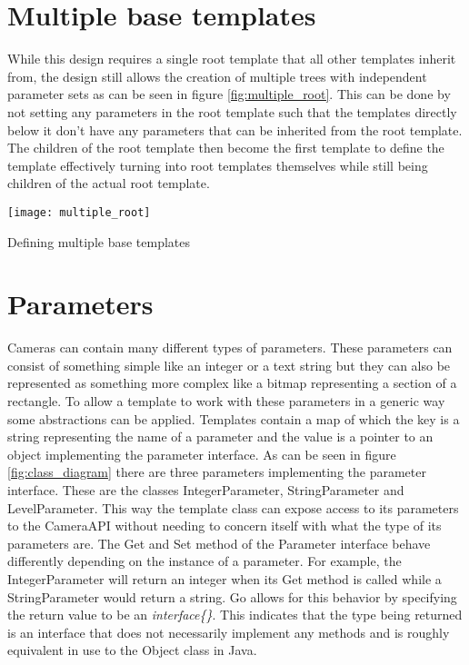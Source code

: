 \section{Multiple base templates} %
While this design requires a single root template that all other templates inherit from, the design still allows the creation of multiple trees with independent parameter sets as can be seen in figure \ref{fig:multiple_root}.
This can be done by not setting any parameters in the root template such that the templates directly below it don't have any parameters that can be inherited from the root template.
The children of the root template then become the first template to define the template effectively turning into root templates themselves while still being children of the actual root template.
\begin{marginfigure}
	\centering
	\texttt{[image: multiple\_root]}
	\caption{Defining multiple base templates}
	\label{fig:multiple_root}
\end{marginfigure}

\section{Parameters}
Cameras can contain many different types of parameters.
These parameters can consist of something simple like an integer or a text string but they can also be represented as something more complex like a bitmap representing a section of a rectangle.
To allow a template to work with these parameters in a generic way some abstractions can be applied.
Templates contain a map of which the key is a string representing the name of a parameter and the value is a pointer to an object implementing the parameter interface.
As can be seen in figure \ref{fig:class_diagram} there are three parameters implementing the parameter interface.
These are the classes IntegerParameter, StringParameter and LevelParameter.
This way the template class can expose access to its parameters to the CameraAPI without needing to concern itself with what the type of its parameters are.
The Get and Set method of the Parameter interface behave differently depending on the instance of a parameter.
For example, the IntegerParameter will return an integer when its Get method is called while a StringParameter would return a string.
Go allows for this behavior by specifying the return value to be an \textit{interface\{\}}.
This indicates that the type being returned is an interface that does not necessarily implement any methods and is roughly equivalent in use to the Object class in Java.

